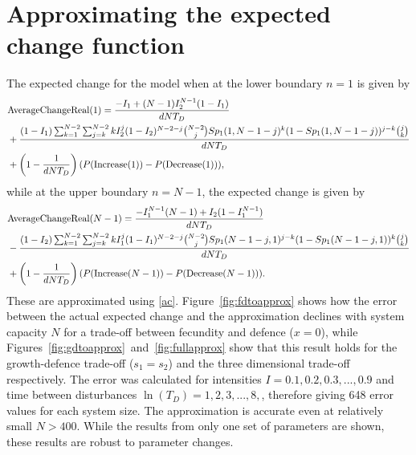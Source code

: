 \documentclass[preprint,10pt,reqno]{amsart}
\begin{document}
 \section{Approximating the expected change function}
 \label{appapproximations}
 The expected change for the model when at the lower boundary $n=1$ is given by
 \begin{align}
\label{acreal1difi}&\text{AverageChangeReal}(1)=\frac{-I_1+(N-1)I_2^{N-1}(1-I_1)}{dNT_D}\\
&+\frac{(1-I_1)\sum_{k=1}^{N-2}\sum_{j=k}^{N-2}k I_2^j(1-I_2)^{N-2-j}{N-2\choose j} Sp_1(1,N-1-j)^k(1-Sp_1(1,N-1-j))^{j-k} {j \choose k}}{dNT_D} \notag \\
 &+ \left(1-\frac{1}{dNT_D}\right)(P(\text{Increase}(1))-P(\text{Decrease}(1))), \notag
 \end{align}
 while at the upper boundary $n=N-1$, the expected change is given by
\begin{align}
 \label{acrealtotdifi}&\text{AverageChangeReal}(N-1)= \frac{-I_1^{N-1}(N-1) +I_2(1-I_1^{N-1})}{dNT_D} \\
 &-\frac{(1-I_2)\sum_{k=1}^{N-2}\sum_{j=k}^{N-2}k I_1^j(1-I_1)^{N-2-j}{N-2\choose j} Sp_1(N-1-j,1)^{j-k}(1-Sp_1(N-1-j,1))^{k} {j \choose k}}{dNT_D} \notag \\
 &+ \left(1-\frac{1}{dNT_D}\right)(P(\text{Increase}(N-1))-P(\text{Decrease}(N-1))). \notag
  \end{align} 
These are approximated using \eqref{ac}. Figure~\ref{fig:fdtoapprox} shows how the error between the actual expected change and the approximation declines with system capacity $N$ for a trade-off between fecundity and defence ($x=0$), while Figures~\ref{fig:gdtoapprox}~and~\ref{fig:fullapprox} show that this result holds for the growth-defence trade-off ($s_1=s_2$) and the three dimensional trade-off respectively. The error was calculated for intensities $I=0.1,0.2,0.3,...,0.9$ and time between disturbances $\ln(T_D)=1,2,3,...,8,$, therefore giving 648 error values for each system size. The approximation is accurate even at relatively small $N>400$. While the results from only one set of parameters are shown, these results are robust to parameter changes.
\end{document}
